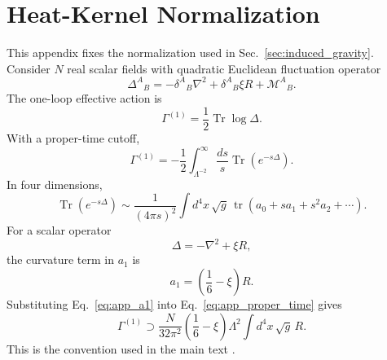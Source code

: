 \documentclass[aps,prd,preprint,longbibliography,nofootinbib,superscriptaddress,floatfix]{revtex4-2}
\newcommand{\Tr}{\operatorname{Tr}}
\newcommand{\tr}{\operatorname{tr}}
\begin{document}

\section{Heat-Kernel Normalization}
\label{app:heat_kernel}

This appendix fixes the normalization used in Sec.~\ref{sec:induced_gravity}.
Consider \(N\) real scalar fields with quadratic Euclidean fluctuation operator
\begin{equation}
    \Delta^A{}_{B}
    =
    -\delta^A{}_{B}\nabla^2
    +
    \delta^A{}_{B}\xi R
    +
    \mathcal M^A{}_{B}.
    \label{eq:app_laplace_operator}
\end{equation}
The one-loop effective action is
\begin{equation}
    \Gamma^{(1)}
    =
    \frac12\Tr\log\Delta .
    \label{eq:app_oneloop}
\end{equation}
With a proper-time cutoff,
\begin{equation}
    \Gamma^{(1)}
    =
    -\frac12
    \int_{\Lambda^{-2}}^\infty
    \frac{ds}{s}
    \Tr(e^{-s\Delta}) .
    \label{eq:app_proper_time}
\end{equation}
In four dimensions,
\begin{equation}
    \Tr(e^{-s\Delta})
    \sim
    \frac{1}{(4\pi s)^2}
    \int d^4x\,\sqrt{g}\,
    \tr(a_0+s a_1+s^2a_2+\cdots).
    \label{eq:app_heat_expansion}
\end{equation}
For a scalar operator
\begin{equation}
    \Delta=-\nabla^2+\xi R,
    \label{eq:app_scalar_operator}
\end{equation}
the curvature term in \(a_1\) is
\begin{equation}
    a_1
    =
    \left(\frac16-\xi\right)R .
    \label{eq:app_a1}
\end{equation}
Substituting Eq.~\eqref{eq:app_a1} into Eq.~\eqref{eq:app_proper_time} gives
\begin{equation}
    \Gamma^{(1)}
    \supset
    \frac{N}{32\pi^2}
    \left(\frac16-\xi\right)
    \Lambda^2
    \int d^4x\,\sqrt{g}\,R .
    \label{eq:app_induced_r}
\end{equation}
This is the convention used in the main text \cite{DeWittDynamicalTheory,
BirrellDavies,GilkeyInvariance}.
\end{document}
